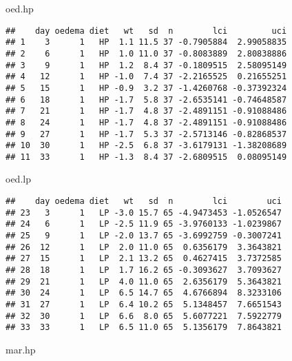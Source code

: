 \documentclass[
  12pt,
  a4paper]{book}
\newenvironment{Shaded}{\begin{snugshade}}{\end{snugshade}}
\newcommand{\NormalTok}[1]{#1}
\begin{document}
\newpage

\begin{Shaded}
\begin{Highlighting}[]
\NormalTok{oed.hp}
\end{Highlighting}
\end{Shaded}

\begin{verbatim}
##    day oedema diet   wt   sd  n        lci         uci
## 1    3      1   HP  1.1 11.5 37 -0.7905884  2.99058835
## 2    6      1   HP  1.0 11.0 37 -0.8083889  2.80838886
## 3    9      1   HP  1.2  8.4 37 -0.1809515  2.58095149
## 4   12      1   HP -1.0  7.4 37 -2.2165525  0.21655251
## 5   15      1   HP -0.9  3.2 37 -1.4260768 -0.37392324
## 6   18      1   HP -1.7  5.8 37 -2.6535141 -0.74648587
## 7   21      1   HP -1.7  4.8 37 -2.4891151 -0.91088486
## 8   24      1   HP -1.7  4.8 37 -2.4891151 -0.91088486
## 9   27      1   HP -1.7  5.3 37 -2.5713146 -0.82868537
## 10  30      1   HP -2.5  6.8 37 -3.6179131 -1.38208689
## 11  33      1   HP -1.3  8.4 37 -2.6809515  0.08095149
\end{verbatim}

\begin{Shaded}
\begin{Highlighting}[]
\NormalTok{oed.lp}
\end{Highlighting}
\end{Shaded}

\begin{verbatim}
##    day oedema diet   wt   sd  n        lci        uci
## 23   3      1   LP -3.0 15.7 65 -4.9473453 -1.0526547
## 24   6      1   LP -2.5 11.9 65 -3.9760133 -1.0239867
## 25   9      1   LP -2.0 13.7 65 -3.6992759 -0.3007241
## 26  12      1   LP  2.0 11.0 65  0.6356179  3.3643821
## 27  15      1   LP  2.1 13.2 65  0.4627415  3.7372585
## 28  18      1   LP  1.7 16.2 65 -0.3093627  3.7093627
## 29  21      1   LP  4.0 11.0 65  2.6356179  5.3643821
## 30  24      1   LP  6.5 14.7 65  4.6766894  8.3233106
## 31  27      1   LP  6.4 10.2 65  5.1348457  7.6651543
## 32  30      1   LP  6.6  8.0 65  5.6077221  7.5922779
## 33  33      1   LP  6.5 11.0 65  5.1356179  7.8643821
\end{verbatim}

\begin{Shaded}
\begin{Highlighting}[]
\NormalTok{mar.hp}
\end{Highlighting}
\end{Shaded}
\end{document}
